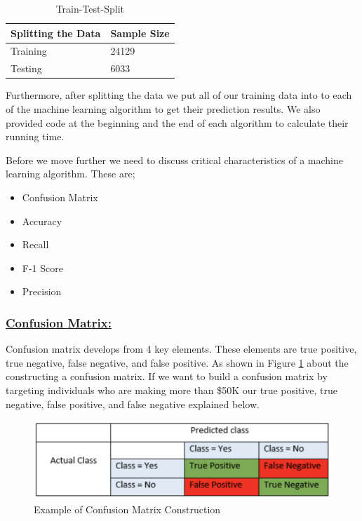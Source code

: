 \documentclass[sigconf]{acmart}
\begin{document}
\begin{table}[!ht]
\centering
\begin{tabular}{|l|l|}
\hline
\textbf{Splitting the Data} & \textbf{Sample Size} \\ \hline
Training                    & 24129                \\ \hline
Testing                     & 6033                 \\ \hline
\end{tabular}
\caption{Train-Test-Split \cite{Borga2017}}
\label{split}
\end{table}

\par Furthermore, after splitting the data we put all of our training data into to each of the machine learning algorithm to get their prediction results. We also provided code at the beginning and the end of each algorithm to calculate their running time.

\par Before we move further we need to discuss critical characteristics of a machine learning algorithm. These are;

\begin{itemize}
    \item Confusion Matrix
    \item Accuracy
    \item Recall
    \item F-1 Score
    \item Precision 
\end{itemize}

\subsubsection{\textbf{\underline{Confusion Matrix:}}}
Confusion matrix develops from 4 key elements. These elements are true positive, true negative, false negative, and false positive. As shown in Figure \ref{fig:confusion-matrix} about the constructing a confusion matrix. If we want to build a confusion matrix by targeting individuals who are making more than \$50K our true positive, true negative, false positive, and false negative explained below. 

\begin{figure}[!ht]
  \centering
      \includegraphics[width=\columnwidth]{images/confusion-matrix.png}
  \caption{Example of Confusion Matrix Construction \cite{www-exsilio}}\label{fig:confusion-matrix}
\end{figure}
\end{document}
